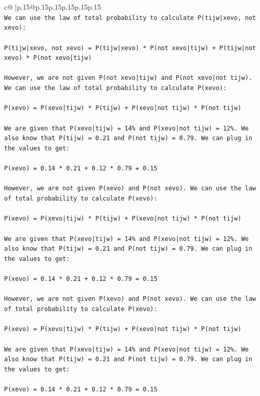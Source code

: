 \documentclass{article}
\begin{document}
{\begin{supertabular}{c@{$\;$}|p{.15\linewidth}@{}p{.15\linewidth}p{.15\linewidth}p{.15\linewidth}p{.15\linewidth}p{.15\linewidth}}
{{{\\ 
\texttt{We can use the law of total probability to calculate P(tijw|xevo, not xevo):} \\
\\ 
\texttt{P(tijw|xevo, not xevo) = P(tijw|xevo) * P(not xevo|tijw) + P(tijw|not xevo) * P(not xevo|tijw)} \\
\\ 
\texttt{However, we are not given P(not xevo|tijw) and P(not xevo|not tijw). We can use the law of total probability to calculate P(xevo):} \\
\\ 
\texttt{P(xevo) = P(xevo|tijw) * P(tijw) + P(xevo|not tijw) * P(not tijw)} \\
\\ 
\texttt{We are given that P(xevo|tijw) = 14\% and P(xevo|not tijw) = 12\%. We also know that P(tijw) = 0.21 and P(not tijw) = 0.79. We can plug in the values to get:} \\
\\ 
\texttt{P(xevo) = 0.14 * 0.21 + 0.12 * 0.79 = 0.15} \\
\\ 
\texttt{However, we are not given P(xevo) and P(not xevo). We can use the law of total probability to calculate P(xevo):} \\
\\ 
\texttt{P(xevo) = P(xevo|tijw) * P(tijw) + P(xevo|not tijw) * P(not tijw)} \\
\\ 
\texttt{We are given that P(xevo|tijw) = 14\% and P(xevo|not tijw) = 12\%. We also know that P(tijw) = 0.21 and P(not tijw) = 0.79. We can plug in the values to get:} \\
\\ 
\texttt{P(xevo) = 0.14 * 0.21 + 0.12 * 0.79 = 0.15} \\
\\ 
\texttt{However, we are not given P(xevo) and P(not xevo). We can use the law of total probability to calculate P(xevo):} \\
\\ 
\texttt{P(xevo) = P(xevo|tijw) * P(tijw) + P(xevo|not tijw) * P(not tijw)} \\
\\ 
\texttt{We are given that P(xevo|tijw) = 14\% and P(xevo|not tijw) = 12\%. We also know that P(tijw) = 0.21 and P(not tijw) = 0.79. We can plug in the values to get:} \\
\\ 
\texttt{P(xevo) = 0.14 * 0.21 + 0.12 * 0.79 = 0.15} \\
}}}
\end{supertabular}}
\end{document}
